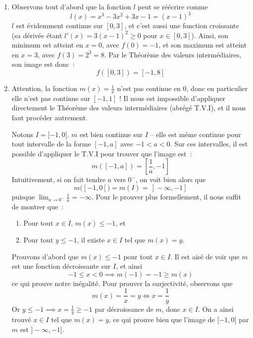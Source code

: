 \begin{exercice}
\enumeratelinefix
\begin{enumerate}
    \item Observons tout d'abord que la fonction $l$ peut se réécrire comme
    \[
    l(x) = x^3 - 3x^2 + 3x - 1 = (x-1)^3
    \]
    $l$ est évidemment continue sur $[0, 3]$, et c'est aussi une fonction croissante (sa dérivée étant $l'(x) = 3(x-1)^2 \geq 0$ pour $x \in [0, 3]$). Ainsi, son minimum est atteint en $x = 0$, avec $f(0) = -1$, et son maximum est atteint en $x = 3$, avec $f(3) = 2^3 = 8$. Par le Théorème des valeurs intermédiaires, son image est donc~:
    \[
    f([0, 3]) = [-1, 8]
    \]
    
    \item Attention, la fonction $m(x) = \frac{1}{x}$ n'est pas continue en $0$, donc en particulier elle n'est pas continue sur $[-1, 1]$ ! Il nous est impossible d'appliquer directement le Théorème des valeurs intermédiaires (abrégé T.V.I), et il nous faut procéder autrement.
    
    Notons $I = [-1, 0[$. $m$ est bien continue sur $I$ -- elle est même continue pour tout intervalle de la forme $[-1, a]$ avec $-1 < a < 0$. Sur ces intervalles, il est possible d'appliquer le T.V.I pour trouver que l'image est~:
    \[
    m([-1, a]) = \left[\frac{1}{a}, -1\right]
    \]
    Intuitivement, si on fait tendre $a$ vers $0^-$, on voit bien alors que 
    \[
    m([-1, 0[) = m(I) = \,]\!-\!\infty, -1]
    \] puisque $\displaystyle\lim_{a \to 0^-} \frac{1}{a} = -\infty$. Pour le prouver plus formellement, il nous suffit de montrer que~:
    \begin{enumerate}
        \item Pour tout $x \in I$, $m(x) \leq -1$, et
        \item Pour tout $y \leq -1$, il existe $x \in I$ tel que $m(x) = y$.
    \end{enumerate}
    
    Prouvons d'abord que $m(x) \leq -1$ pour tout $x \in I$. Il est aisé de voir que $m$ est une fonction décroissante sur $I$, et ainsi
    \[
    -1 \leq x < 0 \implies m(-1) = -1 \geq m(x)
    \]
    ce qui prouve notre inégalité. Pour prouver la surjectivité, observons que
    \[
    m(x) = \frac{1}{x} = y \iff x = \frac{1}{y}
    \]
    Or $y \leq -1 \implies x = \frac{1}{y} \geq -1$ par décroissance de $m$, donc $x \in I$. On a ainsi trouvé $x \in I$ tel que $m(x) = y$, ce qui prouve bien que l'image de $[-1, 0[$ par $m$ est $]\!-\!\infty, -1]$.
    

\end{enumerate}
\end{exercice}

